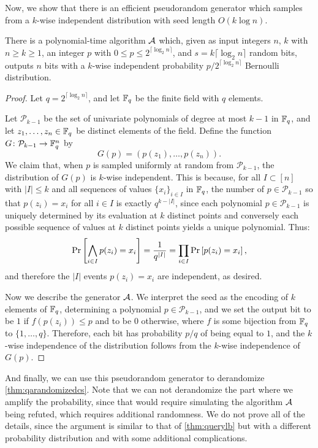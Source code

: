 Now, we show that there is an efficient pseudorandom generator which samples from a $k$-wise
independent distribution with seed length $O(k \log n)$.

\begin{theorem}
\label{thm:kwiseindepgen}
There is a polynomial-time algorithm $\mathcal{A}$ which, given as input integers $n$, $k$ with $n \geq k \geq 1$,
an integer $p$ with $0 \leq p \leq 2^{\lceil \log_2 n \rceil}$, and $s = k \lceil \log_2 n \rceil$
random bits, outputs $n$ bits with a $k$-wise independent probability $p/2^{\lceil \log_2 n \rceil}$ 
Bernoulli distribution.
\end{theorem}
\begin{proof}
Let $q = 2^{\lceil \log_2 n \rceil}$, and let $\mathbb{F}_q$ be the finite field with $q$ elements. 

Let $\mathcal{P}_{k-1}$ be the set of univariate polynomials of degree at most $k-1$ in $\mathbb{F}_q$,
and let $z_1, \ldots, z_n \in \mathbb{F}_q$ be distinct elements of the field. Define the function 
$G \colon \mathcal{P}_{k-1} \to \mathbb{F}^n_q$ by
$$
G(p) = (p(z_1), \ldots, p(z_n)).
$$
We claim that, when $p$ is sampled uniformly at random from $\mathcal{P}_{k-1}$, the distribution
of $G(p)$ is $k$-wise independent. This is because, for all $I \subset [n]$ with $|I| \leq k$ and 
all sequences of values $\{x_i\}_{i\in I}$ in $\mathbb{F}_q$, the number of $p \in \mathcal{P}_{k-1}$ so that 
$p(z_i) = x_i$ for all $i \in I$ is exactly $q^{k-|I|}$, since each polynomial $p \in \mathcal{P}_{k-1}$
is uniquely determined by its evaluation at $k$ distinct points and conversely each possible sequence 
of values at $k$ distinct points yields a unique polynomial. Thus:
$$
\text{Pr}\left[\bigwedge_{i\in I} p(z_i) = x_i\right] = \frac{1}{q^{|I|}} = \prod_{i\in I} \text{Pr}\left[p(z_i) = x_i\right],
$$
and therefore the $|I|$ events $p(z_i) = x_i$ are independent, as desired. 

Now we describe the generator $\mathcal{A}$. We interpret the seed as the encoding of $k$ elements of $\mathbb{F}_q$,
determining a polynomial $p \in \mathcal{P}_{k-1}$, and we set the output bit to be $1$ if 
$f(p(z_i)) \leq p$ and to be $0$ otherwise, where $f$ is some bijection from $\mathbb{F}_q$ to $\{1, \ldots, q\}$.
Therefore, each bit has probability $p/q$ of being equal to $1$, and the $k$-wise independence of the
distribution follows from the $k$-wise independence of $G(p)$. 
\end{proof}

And finally, we can use this pseudorandom generator to derandomize \cref{thm:qarandomizedcs}.
Note that we can not derandomize the part where we amplify the probability, since that would
require simulating the algorithm $\mathcal{A}$ being refuted, which requires additional randomness. 
We do not prove all of the details, since the argument is similar to that of \cref{thm:querylb}
but with a different probability distribution and with some additional complications. 

